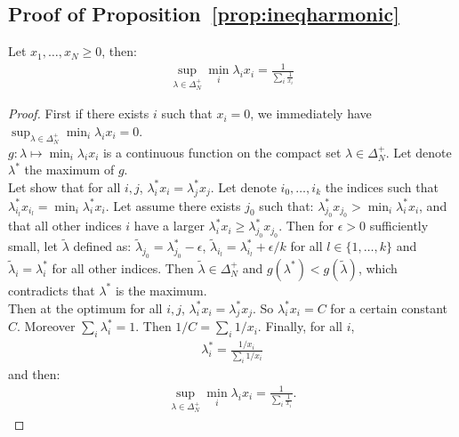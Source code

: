 \subsection{Proof of Proposition~\ref{prop:ineqharmonic}}
\label{prv:ineqharmonic}
\begin{lemma}
\label{lem:supmin}
Let $x_1,\dots,x_N\geq0$, then:
\begin{align*}
    \sup_{\lambda\in\Delta_N^{+}} \min_i\lambda_i x_i= \frac{1}{\sum_i\frac{1}{x_i}}
\end{align*}
\end{lemma}
\begin{proof}First if there exists $i$ such that $x_i=0$, we immediately have  $\sup_{\lambda\in\Delta_N^{+}} \min_i\lambda_i x_i=0$.\\
$g:\lambda\mapsto \min_i\lambda_i x_i$ is a continuous function on the compact set $\lambda\in\Delta_N^{+}$. Let denote $\lambda^*$ the maximum of $g$. \\
Let show that for all $i,j$, $\lambda^*_ix_i=\lambda^*_jx_j$. Let denote $i_0,\dots,i_k$ the indices such that $\lambda^*_{i_l}x_{i_l}=\min_i\lambda^*_i x_i$. Let assume there exists $j_0$ such that: $\lambda^*_{j_0}x_{j_0}>\min_i\lambda^*_i x_i$, and that all  other indices $i$ have a larger $\lambda^*_i x_i\geq \lambda^*_{j_0}x_{j_0}$. Then for $\epsilon>0$ sufficiently small, let $\tilde{\lambda}$ defined as: $\tilde{\lambda}_{j_0}=\lambda
^*_{j_0}-\epsilon$, $\tilde{\lambda}_{i_l}=\lambda
^*_{i_l}+\epsilon/k$ for all $l\in\{1,\dots,k\}$ and $\tilde{\lambda}_{i}=\lambda
^*_{i}$ for all other indices. Then $\tilde{\lambda}\in\Delta_N^{+}$ and $g(\lambda^*)<g(\tilde{\lambda})$, which contradicts that $\lambda^*$ is the maximum.\\
Then at the optimum for all $i,j$, $\lambda^*_ix_i=\lambda^*_jx_j$. So $\lambda^*_ix_i=C$ for a certain constant $C$. Moreover $\sum_i\lambda^*_i=1$. Then $1/C=\sum_i1/x_i$. Finally, for all $i$, 
\begin{align*}
\lambda^*_i=\frac{1/x_i}{\sum_i1/x_i}   
\end{align*}
and then:
\begin{align*}
\sup_{\lambda\in\Delta_N^{+}} \min_i\lambda_i x_i= \frac{1}{\sum_i\frac{1}{x_i}}.
\end{align*}

\end{proof}
